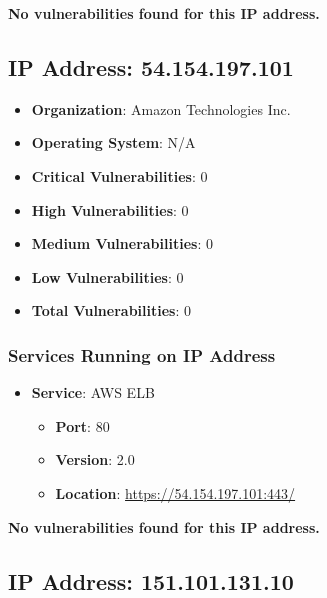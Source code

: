 \documentclass{article}
\begin{document}
\textbf{No vulnerabilities found for this IP address.}




\clearpage



\subsection{IP Address: 54.154.197.101}

\begin{itemize}
    \item \textbf{Organization}: Amazon Technologies Inc.
    \item \textbf{Operating System}:  N/A 
    \item \textbf{Critical Vulnerabilities}: 0
    \item \textbf{High Vulnerabilities}: 0
    \item \textbf{Medium Vulnerabilities}: 0
    \item \textbf{Low Vulnerabilities}: 0
    \item \textbf{Total Vulnerabilities}: 0
\end{itemize}

\subsubsection*{Services Running on IP Address}

\begin{itemize}
    
        \item \textbf{Service}: AWS ELB
        \begin{itemize}
            \item \textbf{Port}: 80
            \item \textbf{Version}:  2.0 
            \item \textbf{Location}: \href{ https://54.154.197.101:443/ }{ https://54.154.197.101:443/ }
        \end{itemize}
    
\end{itemize}


\textbf{No vulnerabilities found for this IP address.}




\clearpage



\subsection{IP Address: 151.101.131.10}
\end{document}
